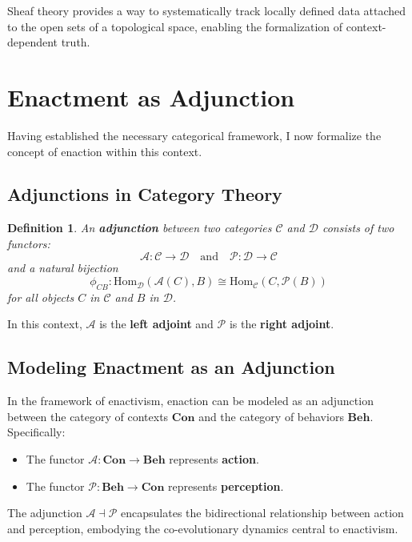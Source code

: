 \documentclass{article}
\newtheorem{definition}{Definition}[section]
\begin{document}
Sheaf theory provides a way to systematically track locally defined data attached to the open sets of a topological space, enabling the formalization of context-dependent truth.

\section{Enactment as Adjunction}

Having established the necessary categorical framework, I now formalize the concept of enaction within this context.

\subsection{Adjunctions in Category Theory}

\begin{definition}
An \textbf{adjunction} between two categories $\mathcal{C}$ and $\mathcal{D}$ consists of two functors:
\[
\mathcal{A} \colon \mathcal{C} \to \mathcal{D} \quad \text{and} \quad \mathcal{P} \colon \mathcal{D} \to \mathcal{C}
\]
and a natural bijection
\[
\phi_{CB} \colon \text{Hom}_{\mathcal{D}} ( \mathcal{A}(C), B ) \cong \text{Hom}_{\mathcal{C}} (C, \mathcal{P}(B))
\]
for all objects $C$ in $\mathcal{C}$ and $B$ in $\mathcal{D}$.
\end{definition}

In this context, $\mathcal{A}$ is the \textbf{left adjoint} and $\mathcal{P}$ is the \textbf{right adjoint}.

\subsection{Modeling Enactment as an Adjunction}

In the framework of enactivism, enaction can be modeled as an adjunction between the category of contexts $\mathbf{Con}$ and the category of behaviors $\mathbf{Beh}$. Specifically:

\begin{itemize}
    \item The functor $\mathcal{A} \colon \mathbf{Con} \to \mathbf{Beh}$ represents \textbf{action}.
    \item The functor $\mathcal{P} \colon \mathbf{Beh} \to \mathbf{Con}$ represents \textbf{perception}.
\end{itemize}

The adjunction $\mathcal{A} \dashv \mathcal{P}$ encapsulates the bidirectional relationship between action and perception, embodying the co-evolutionary dynamics central to enactivism.
\end{document}
